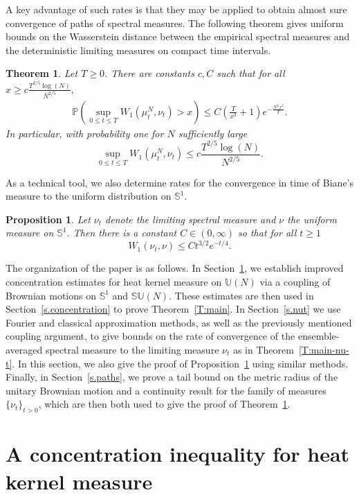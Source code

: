 \documentclass[11pt]{article}
\newtheorem{thm}[theo]{Theorem}
\newtheorem{prop}[theo]{Proposition}
\theoremstyle{definition}
\numberwithin{equation}{section}
\numberwithin{figure}{section}
\numberwithin{table}{section}
\newcommand{\Prob}{\mathbb{P}}
\begin{document}
A key advantage of such rates is that they may be applied to obtain almost sure convergence of paths of spectral measures. The following theorem gives uniform bounds on the Wasserstein distance between the empirical spectral measures and the deterministic limiting measures on compact time intervals.

\begin{thm}\label{T:close-paths}
Let $T\ge 0$. There are constants $c,C$ such that for all $x\ge c\frac{T^{2/5}\log(N)}{N^{2/5}},$
\begin{align*}
\Prob\left(\sup_{0\le t\le
T}W_1(\mu^N_t,\nu_t)>x\right)\le C\left(\frac{T}{x^2}+1\right)e^{-\frac{N^2x^2}{T}}.
\end{align*}
In particular, with probability one for $N$ sufficiently large
\[
\sup_{0\le t\le T}W_1(\mu^N_t,\nu_t)\le c\frac{T^{2/5}\log(N)}{N^{2/5}}.
\]
\end{thm}

As a technical tool, we also determine rates for the convergence in time of Biane's measure to the uniform distribution on $\mathbb{S}^1$.

\begin{prop}\label{T:biane-to-uniform}
Let $\nu_t$ denote the limiting spectral measure and $\nu$ the uniform measure on $\mathbb{S}^1$. Then there is a constant $C\in(0,\infty)$ so that for all $t\ge1$
\[
W_1(\nu_t,\nu)\le Ct^{3/2}e^{-t/4}.
\]
\end{prop}

The organization of the paper is as follows. In Section~\ref{s.lsi}, we establish improved concentration estimates for heat kernel measure on $\mathbb{U}(N)$ via a coupling of Brownian motions on $\mathbb{S}^1$ and $\mathbb{SU}(N)$. These estimates are then used in Section~\ref{s.concentration} to prove Theorem~\ref{T:main}. In Section~\ref{s.nut} we use Fourier and classical approximation methods, as well as the previously mentioned coupling argument, to give bounds on the rate of convergence of the ensemble-averaged spectral measure to the limiting measure $\nu_t$ as in Theorem~\ref{T:main-nu-t}. In this section, we also give the proof of Proposition~\ref{T:biane-to-uniform} using similar methods. Finally, in Section~\ref{s.paths}, we prove a tail bound on the metric radius of the unitary Brownian motion and a continuity result for the family of measures $\{\nu_t\}_{t>0}$, which are then both used to give the proof of Theorem~\ref{T:close-paths}.


\section{A concentration inequality for heat kernel measure}\label{s.lsi}
\end{document}

